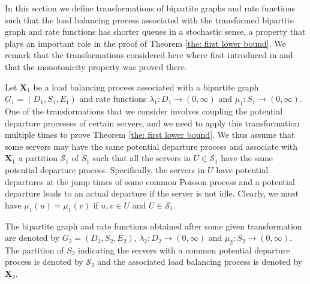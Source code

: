 \documentclass[a4paper, 12pt]{article}
\theoremstyle{definition}
\newcommand{\map}[3]{#1 : #2 \longrightarrow #3}
\newcommand{\bX}{\boldsymbol{X}}
\newcommand{\calS}{\mathcal{S}}
\begin{document}
In this section we define transformations of bipartite graphs and rate functions such that the load balancing process associated with the transformed bipartite graph and rate functions has shorter queues in a stochastic sense, a property that plays an important role in the proof of Theorem \ref{the: first lower bound}. We remark that the transformations considered here where first introduced in \cite{goldsztajn2024server} and that the monotonicity property was proved there.

Let $\bX_1$ be a load balancing process associated with a bipartite graph $G_1 = (D_1, S_1, E_1)$ and rate functions $\map{\lambda_1}{D_1}{(0, \infty)}$ and $\map{\mu_1}{S_1}{(0, \infty)}$. One of the transformations that we consider involves coupling the potential departure processes of certain servers, and we need to apply this transformation multiple times to prove Theorem \ref{the: first lower bound}. We thus assume that some servers may have the same potential departure process and associate with $\bX_1$ a partition $\calS_1$ of $S_1$ such that all the servers in $U \in \calS_1$ have the same potential departure process. Specifically, the servers in $U$ have potential departures at the jump times of some common Poisson process and a potential departure leads to an actual departure if the server is not idle. Clearly, we must have $\mu_1(u) = \mu_1(v)$ if $u, v \in U$ and $U \in \calS_1$.

The bipartite graph and rate functions obtained after some given transformation are denoted by $G_2 = (D_2, S_2, E_2)$, $\map{\lambda_2}{D_2}{(0, \infty)}$ and $\map{\mu_2}{S_2}{(0, \infty)}$. The partition of $S_2$ indicating the servers with a common potential departure process is denoted by $\calS_2$ and the associated load balancing process is denoted by $\bX_2$.
\end{document}
